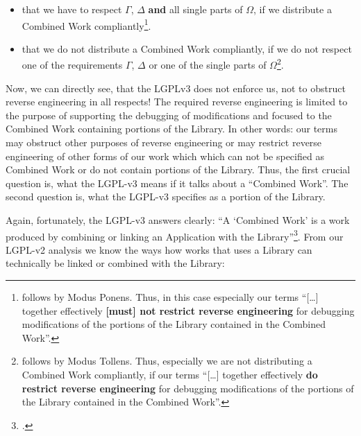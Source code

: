 \begin{itemize}
  \item that we have to respect $\Gamma$, $\Delta$ \textbf{and} all single parts
  of $\Omega$, if we distribute a Combined Work compliantly\footnote{follows by
  Modus Ponens. Thus, in this case especially our terms \enquote{[\ldots]
  together effectively \textbf{[must] not restrict reverse engineering} for
  debugging modifications of the portions of the Library contained in the
  Combined Work}.}.
  \item that we do not distribute a Combined Work compliantly, if we do not
  respect one of the requirements $\Gamma$, $\Delta$ or one of the single parts
  of $\Omega$\footnote{follows by Modus Tollens. Thus, especially we are not
  distributing a Combined Work compliantly, if our terms \enquote{[\ldots]
  together effectively \textbf{do restrict reverse engineering} for debugging
  modifications of the portions of the Library contained in the Combined
  Work}.}.
\end{itemize}

Now, we can directly see, that the LGPLv3 does not enforce us, not to obstruct
reverse engineering in all respects! The required reverse engineering is limited
to the purpose of supporting the debugging of modifications and focused to the
Combined Work containing portions of the Library. In other words: our terms may
obstruct other purposes of reverse engineering or may restrict reverse
engineering of other forms of our work which which can not be specified as
Combined Work or do not contain portions of the Library. Thus, the first crucial
question is, what the LGPL-v3 means if it talks about a \enquote{Combined Work}.
The second question is, what the LGPL-v3 specifies as a portion of the Library.

Again, fortunately, the LGPL-v3 answers clearly: \enquote{A \enquote{Combined
Work} is a work produced by combining or linking an Application with the
Library}\footcite[cf.][\nopage wp., §0]{Lgpl30OsiLicense2007a}. From our LGPL-v2
analysis we know the ways how works that uses a Library can technically be
linked or combined with the Library:

